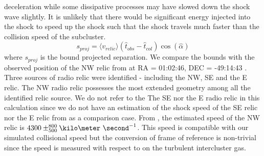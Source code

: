 deceleration while some dissipative processes may have slowed down the shock wave slightly. It is unlikely that there
would be significant energy injected into the shock to speed up the shock
such that the shock travels much faster than the collision speed of the
subcluster.
\begin{equation}
	s_{proj} = \langle v_{relic} \rangle (\hat{t}_{obs} - \hat{t}_{col}) \cos(\hat{\alpha})
\end{equation}
where $s_{proj}$ is the bound projected separation. 
We compare the bounds with the observed position of the NW relic from
\citet{L13} at RA = 01:02:46, DEC = -49:14:43 \citep{L13}.
Three sources of radio relic
were identified - including the NW, SE and the E relic. The NW radio
relic possesses the most extended geometry among all the identified relic source. 
We do not refer to the The SE nor the E radio relic in this calculation
since we do not have an estimation of the shock speed of the SE relic
nor the E relic from \citealt{L13} as a comparison case.    
From \citet{L13}, the estimated speed of the NW relic is $4300 \pm
^{800}_{500}\kilo\meter~\second^{-1}$. This speed is compatible with our
simulated collisional speed but the conversion of frame of reference is
non-trivial since the speed is measured with respect to on the turbulent intercluster gas.






